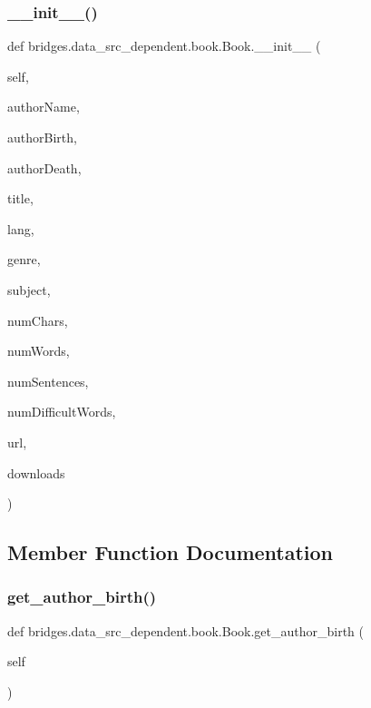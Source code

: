 \subsubsection{\texorpdfstring{\+\_\+\+\_\+init\+\_\+\+\_\+()}{\_\_init\_\_()}}
{\footnotesize\ttfamily def bridges.\+data\+\_\+src\+\_\+dependent.\+book.\+Book.\+\_\+\+\_\+init\+\_\+\+\_\+ (\begin{DoxyParamCaption}\item[{}]{self,  }\item[{}]{author\+Name,  }\item[{}]{author\+Birth,  }\item[{}]{author\+Death,  }\item[{}]{title,  }\item[{}]{lang,  }\item[{}]{genre,  }\item[{}]{subject,  }\item[{}]{num\+Chars,  }\item[{}]{num\+Words,  }\item[{}]{num\+Sentences,  }\item[{}]{num\+Difficult\+Words,  }\item[{}]{url,  }\item[{}]{downloads }\end{DoxyParamCaption})}



\subsection{Member Function Documentation}
\mbox{\label{classbridges_1_1data__src__dependent_1_1book_1_1_book_a2300650495462b37ac535218712a9daa}} 
\subsubsection{\texorpdfstring{get\+\_\+author\+\_\+birth()}{get\_author\_birth()}}
{\footnotesize\ttfamily def bridges.\+data\+\_\+src\+\_\+dependent.\+book.\+Book.\+get\+\_\+author\+\_\+birth (\begin{DoxyParamCaption}\item[{}]{self }\end{DoxyParamCaption})}

